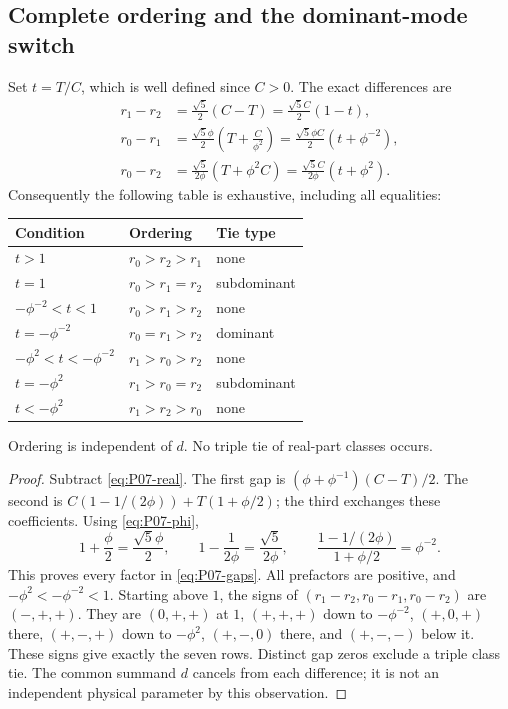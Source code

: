 \subsection{Complete ordering and the dominant-mode switch}
\label{slot:P07-2}
\begin{theorem}
\label{thm:P07-ordering}
Set $t=T/C$, which is well defined since $C>0$. The exact differences are
\begin{align}
 r_1-r_2&=\frac{\sqrt5}{2}(C-T)
              =\frac{\sqrt5 C}{2}(1-t),\label{eq:P07-gaps}\\
 r_0-r_1&=\frac{\sqrt5\phi}{2}
                    \left(T+\frac{C}{\phi^2}\right)
              =\frac{\sqrt5\phi C}{2}(t+\phi^{-2}),\nonumber\\
 r_0-r_2&=\frac{\sqrt5}{2\phi}(T+\phi^2 C)
              =\frac{\sqrt5 C}{2\phi}(t+\phi^2).\nonumber
\end{align}
Consequently the following table is exhaustive, including all equalities:
\begin{center}
\renewcommand{\arraystretch}{1.15}
\begin{tabular}{@{}l l l@{}}
\toprule
Condition&Ordering&Tie type\\
\midrule
$t>1$&$r_0>r_2>r_1$&none\\
$t=1$&$r_0>r_1=r_2$&subdominant\\
$-\phi^{-2}<t<1$&$r_0>r_1>r_2$&none\\
$t=-\phi^{-2}$&$r_0=r_1>r_2$&dominant\\
$-\phi^2<t<-\phi^{-2}$&$r_1>r_0>r_2$&none\\
$t=-\phi^2$&$r_1>r_0=r_2$&subdominant\\
$t<-\phi^2$&$r_1>r_2>r_0$&none\\
\bottomrule
\end{tabular}
\end{center}
Ordering is independent of $d$. No triple tie of real-part classes occurs.
\end{theorem}
\begin{proof}
Subtract \eqref{eq:P07-real}. The first gap is
$(\phi+\phi^{-1})(C-T)/2$. The second is
$C(1-1/(2\phi))+T(1+\phi/2)$; the third exchanges these
coefficients. Using \eqref{eq:P07-phi},
\[
 1+\frac\phi2=\frac{\sqrt5\phi}{2},\qquad
 1-\frac1{2\phi}=\frac{\sqrt5}{2\phi},\qquad
 \frac{1-1/(2\phi)}{1+\phi/2}=\phi^{-2}.
\]
This proves every factor in \eqref{eq:P07-gaps}. All prefactors are
positive, and $-\phi^2<-\phi^{-2}<1$. Starting above $1$, the
signs of $(r_1-r_2,r_0-r_1,r_0-r_2)$ are $(-,+,+)$.
They are $(0,+,+)$ at $1$, $(+,+,+)$ down to $-\phi^{-2}$,
$(+,0,+)$ there, $(+,-,+)$ down to $-\phi^2$,
$(+,-,0)$ there, and $(+,-,-)$ below it. These signs give
exactly the seven rows. Distinct gap zeros exclude a triple class tie.
The common summand $d$ cancels from each difference; it is not an
independent physical parameter by this observation.
\end{proof}

